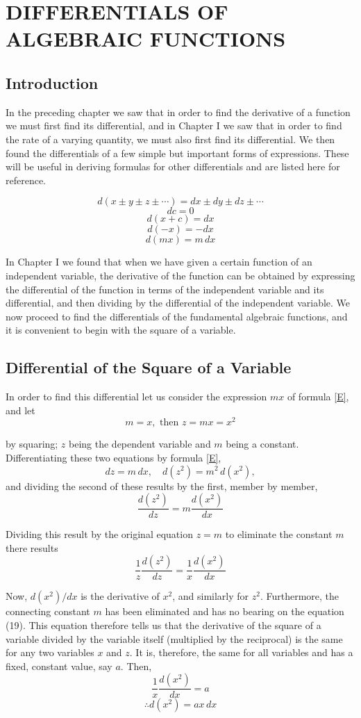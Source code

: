 \chapter{DIFFERENTIALS OF ALGEBRAIC FUNCTIONS}

\section{Introduction}
In the preceding chapter we saw that in order to find the derivative of a function we must first find its differential, and in Chapter I we saw that in order to find the rate of a varying quantity, we must also first find its differential. We then found the differentials of a few simple but important forms of expressions. These will be useful in deriving formulas for other differentials and are listed here for reference.

\[d(x \pm y \pm z \pm \cdots) = dx \pm dy \pm dz \pm \cdots \tag{A} \label{A}\]
\[dc = 0 \tag{B} \label{B}\]
\[d(x + c) = dx \tag{C} \label{C}\]
\[d(-x) = -dx \tag{D} \label{D}\]
\[d(mx) = m\,dx \tag{E} \label{E}\]

In Chapter I we found that when we have given a certain function of an independent variable, the derivative of the function can be obtained by expressing the differential of the function in terms of the independent variable and its differential, and then dividing by the differential of the independent variable. We now proceed to find the differentials of the fundamental algebraic functions, and it is convenient to begin with the square of a variable.

\section{Differential of the Square of a Variable}
In order to find this differential let us consider the expression $mx$ of formula \eqref{E}, and let
\[m = x, \text{ then } z = mx = x^2\]

by squaring; $z$ being the dependent variable and $m$ being a constant. Differentiating these two equations by formula \eqref{E},
\[dz = m\,dx, \quad d(z^2) = m^2\,d(x^2),\]
and dividing the second of these results by the first, member by member,
\[\frac{d(z^2)}{dz} = m \frac{d(x^2)}{dx}\]

Dividing this result by the original equation $z = m$ to eliminate the constant $m$ there results
\[\frac{1}{z}\frac{d(z^2)}{dz} = \frac{1}{x}\frac{d(x^2)}{dx} \tag{19} \label{19}\]

Now, $d(x^2)/dx$ is the derivative of $x^2$, and similarly for $z^2$. Furthermore, the connecting constant $m$ has been eliminated and has no bearing on the equation (19). This equation therefore tells us that the derivative of the square of a variable divided by the variable itself (multiplied by the reciprocal) is the same for any two variables $x$ and $z$. It is, therefore, the same for all variables and has a fixed, constant value, say $a$. Then,
\[\frac{1}{x}\frac{d(x^2)}{dx} = a\]
\[\therefore d(x^2) = ax\,dx \tag{20} \label{20}\]

